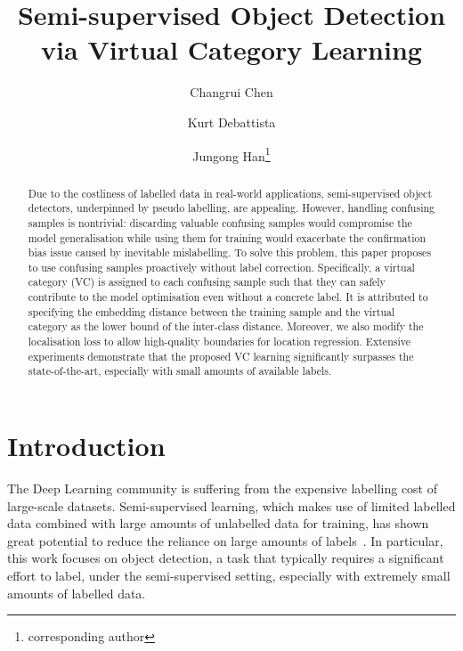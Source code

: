 \documentclass[runningheads]{llncs}
\begin{document}
\pagestyle{headings}
\mainmatter
\def\ECCVSubNumber{5010}  

\title{Semi-supervised Object Detection via Virtual Category Learning} 



\author{Changrui Chen \and
Kurt Debattista \and
Jungong Han\thanks{corresponding author} }

\maketitle

\begin{abstract}

Due to the costliness of labelled data in real-world applications, semi-supervised object detectors, underpinned by pseudo labelling, are appealing. However, handling confusing samples is nontrivial: discarding valuable confusing samples would compromise the model generalisation while using them for training would exacerbate the confirmation bias issue caused by inevitable mislabelling. To solve this problem, this paper proposes to use confusing samples proactively without label correction. Specifically, a virtual category (VC) is assigned to each confusing sample such that they can safely contribute to the model optimisation even without a concrete label. It is attributed to specifying the embedding distance between the training sample and the virtual category as the lower bound of the inter-class distance. Moreover, we also modify the localisation loss to allow high-quality boundaries for location regression. Extensive experiments demonstrate that the proposed VC learning significantly surpasses the state-of-the-art, especially with small amounts of available labels.

\vspace{-0.5em}
\end{abstract}


\section{Introduction}
\label{sec:intro}

The Deep Learning community is suffering from the expensive labelling cost of large-scale datasets. Semi-supervised learning, which makes use of limited labelled data combined with large amounts of unlabelled data for training, has shown great potential to reduce the reliance on large amounts of labels~\cite{Yen-Cheng_2021_Unb,David_2019_Mix,Kihyuk_2020_Fix,Junnan_2020_CoM}. In particular, this work focuses on object detection, a task that typically requires a significant effort to label, under the semi-supervised setting, especially with extremely small amounts of labelled data.
\end{document}
